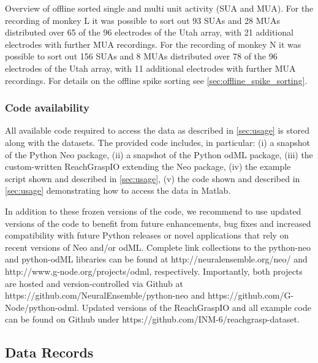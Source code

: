{\begin{table}
\caption[Overview of offline sorted single and multi unit activity (SUA and MUA)]{Overview of offline sorted single and multi unit activity (SUA and MUA). For the recording of monkey L it was possible to sort out 93 SUAs and 28 MUAs distributed over 65 of the 96 electrodes of the Utah array, with 21 additional electrodes with further MUA recordings. For the recording of monkey N it was possible to sort out 156 SUAs and 8 MUAs distributed over 78 of the
96 electrodes of the Utah array, with 11 additional electrodes with further MUA recordings. For details on the offline spike sorting see \cref{sec:offline_spike_sorting}.}
\label{tab:datafiles_unitactivity}
\end{table}

\subsubsection{Code availability}
\label{sec:code_availability}

All available code required to access the data as described in \cref{sec:usage} is stored along with the datasets. The provided code includes, in particular: (i) a snapshot of the Python Neo package, (ii) a snapshot of the Python odML package, (iii) the custom-written ReachGraspIO extending the Neo package, (iv) the example script shown and described in \cref{sec:usage}, (v) the code shown and described in \cref{sec:usage} demonstrating how to access the data in Matlab.

In addition to these frozen versions of the code, we recommend to use updated versions of the code to benefit from future enhancements, bug fixes and increased compatibility with future Python releases or novel applications that rely on recent versions of Neo and/or odML. Complete link collections to the python-neo and python-odML libraries can be found at http://neuralensemble.org/neo/ and http://www.g-node.org/projects/odml, respectively. Importantly, both projects are hosted and version-controlled via Github at https://github.com/NeuralEnsemble/python-neo and https://github.com/G-Node/python-odml. Updated versions of the ReachGraspIO and all example code can be found on Github under https://github.com/INM-6/reachgrasp-dataset.

\subsection{Data Records}

}
